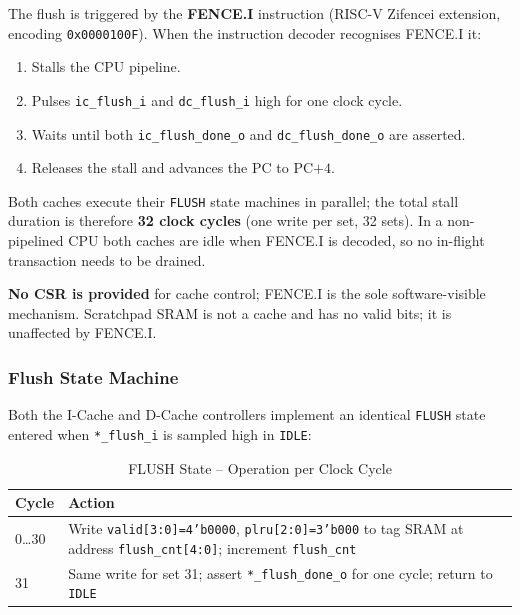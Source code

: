 The flush is triggered by the \textbf{FENCE.I} instruction
(RISC-V Zifencei extension, encoding \texttt{0x0000100F}).
When the instruction decoder recognises FENCE.I it:

\begin{enumerate}
  \item Stalls the CPU pipeline.
  \item Pulses \texttt{ic\_flush\_i} and \texttt{dc\_flush\_i} high for
    one clock cycle.
  \item Waits until both \texttt{ic\_flush\_done\_o} and
    \texttt{dc\_flush\_done\_o} are asserted.
  \item Releases the stall and advances the PC to PC$+4$.
\end{enumerate}

Both caches execute their \texttt{FLUSH} state machines in parallel;
the total stall duration is therefore \textbf{32 clock cycles}
(one write per set, 32 sets).
In a non-pipelined CPU both caches are idle when FENCE.I is decoded,
so no in-flight transaction needs to be drained.

\textbf{No CSR is provided} for cache control; FENCE.I is the sole
software-visible mechanism.
Scratchpad SRAM is not a cache and has no valid bits; it is unaffected
by FENCE.I.

\subsubsection{Flush State Machine}

Both the I-Cache and D-Cache controllers implement an identical
\texttt{FLUSH} state entered when \texttt{*\_flush\_i} is sampled high
in \texttt{IDLE}:

\begin{table}[H]
\caption{FLUSH State -- Operation per Clock Cycle}
\label{tab:asFlushFsm}
\centering
\begin{tabularx}{\textwidth}{|l |X|}
  \hline
  Cycle & Action \\
  \hline
  \hline
  0\ldots30 & Write \texttt{valid[3:0]=4'b0000}, \texttt{plru[2:0]=3'b000}
              to tag SRAM at address \texttt{flush\_cnt[4:0]}; increment
              \texttt{flush\_cnt} \\
  \hline
  31        & Same write for set 31; assert \texttt{*\_flush\_done\_o} for
              one cycle; return to \texttt{IDLE} \\
  \hline
\end{tabularx}
\end{table}

